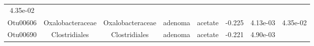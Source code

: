 \documentclass[11pt,]{article}
\begin{document}
\begin{longtable}[]{@{}cccccccc@{}}
\begin{minipage}[t]{0.08\columnwidth}
4.35e-02\strut
\end{minipage}\tabularnewline
\begin{minipage}[t]{0.08\columnwidth}\centering\strut
Otu00606\strut
\end{minipage} & \begin{minipage}[t]{0.15\columnwidth}\centering\strut
Oxalobacteraceae\strut
\end{minipage} & \begin{minipage}[t]{0.15\columnwidth}\centering\strut
Oxalobacteraceae\strut
\end{minipage} & \begin{minipage}[t]{0.08\columnwidth}\centering\strut
adenoma\strut
\end{minipage} & \begin{minipage}[t]{0.09\columnwidth}\centering\strut
acetate\strut
\end{minipage} & \begin{minipage}[t]{0.07\columnwidth}\centering\strut
-0.225\strut
\end{minipage} & \begin{minipage}[t]{0.08\columnwidth}\centering\strut
4.13e-03\strut
\end{minipage} & \begin{minipage}[t]{0.08\columnwidth}\centering\strut
4.35e-02\strut
\end{minipage}\tabularnewline
\begin{minipage}[t]{0.08\columnwidth}\centering\strut
Otu00690\strut
\end{minipage} & \begin{minipage}[t]{0.15\columnwidth}\centering\strut
Clostridiales\strut
\end{minipage} & \begin{minipage}[t]{0.15\columnwidth}\centering\strut
Clostridiales\strut
\end{minipage} & \begin{minipage}[t]{0.08\columnwidth}\centering\strut
adenoma\strut
\end{minipage} & \begin{minipage}[t]{0.09\columnwidth}\centering\strut
acetate\strut
\end{minipage} & \begin{minipage}[t]{0.07\columnwidth}\centering\strut
-0.221\strut
\end{minipage} & \begin{minipage}[t]{0.08\columnwidth}\centering\strut
4.90e-03\strut
\end{minipage} & \begin{minipage}[t]{0.08\columnwidth}\centering\strut

\end{minipage}
\end{longtable}
\end{document}

